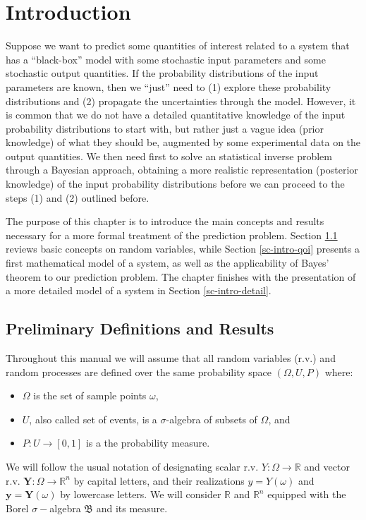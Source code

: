 \chapter{Introduction}\label{ch-int}
\thispagestyle{headings}

Suppose we want to predict some quantities of interest related to a system that
has a ``black-box'' model with
some stochastic input parameters and
some stochastic output quantities.
If the probability distributions of the input parameters are known, then we ``just'' need to
(1) explore these probability distributions and (2) propagate the uncertainties through the model.
However, it is common that we do not have a detailed quantitative knowledge of the input probability distributions to start with,
but rather just a vague idea (prior knowledge) of what they should be, augmented by some experimental data on the output quantities.
We then need first to solve an statistical inverse problem through a Bayesian approach, obtaining a more realistic representation
(posterior knowledge) of the input probability distributions before we can proceed to the steps (1) and (2) outlined before.

The purpose of this chapter is to introduce the main concepts and results necessary for
a more formal treatment of the prediction problem.
Section \ref{sc-intro-prelim} reviews basic concepts on random variables, while
Section \ref{sc-intro-qoi} presents a first mathematical model of a system, as well as the applicability of Bayes' theorem to our prediction problem.
The chapter finishes with the presentation of a more detailed model of a system in Section \ref{sc-intro-detail}.

\section{Preliminary Definitions and Results}\label{sc-intro-prelim}

Throughout this manual we will assume that all random variables (r.v.) and random processes are defined over the same probability space $(\Omega,U,P)$ where:
\begin{itemize}
\item $\Omega$ is the set of sample points $\omega$,
\item $U$, also called set of events, is a $\sigma$-algebra of subsets of $\Omega$, and
\item $P:U\rightarrow[0,1]$ is a the probability measure.
\end{itemize}
We will follow the usual notation of designating
scalar r.v. $Y:\Omega\rightarrow\mathbb{R}$ and
vector r.v. $\mathbf{Y}:\Omega\rightarrow\mathbb{R}^n$
by capital letters,
and their realizations $y=Y(\omega)$ and $\mathbf{y}=\mathbf{Y}(\omega)$ by lowercase letters.
We will consider $\mathbb{R}$ and $\mathbb{R}^n$ equipped with the Borel $\sigma-$algebra $\mathfrak{B}$ and its measure.

